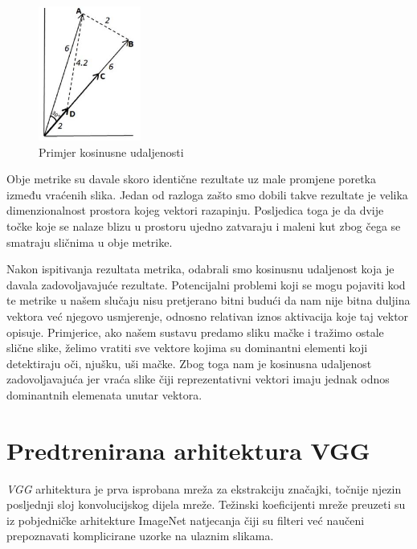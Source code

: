 \documentclass[times, utf8, proizvoljni, numeric]{fer}
\begin{document}
\begin{figure}[!ht]
	\begin{center}
		\captionsetup{justification=centering}
		\includegraphics[width=0.3\textwidth]{./imgs/kosinusna_udaljenost.png}
		\caption{Primjer kosinusne udaljenosti \cite{VectorSimilarity}}
		\label{fg:kosinusna_udaljenost}
	\end{center}
\end{figure}

Obje metrike su davale skoro identične rezultate uz male promjene poretka između vraćenih slika. Jedan od razloga zašto smo dobili takve rezultate je velika dimenzionalnost prostora kojeg vektori razapinju. Posljedica toga je da dvije točke koje se nalaze blizu u prostoru ujedno zatvaraju i maleni kut zbog čega se smatraju sličnima u obje metrike.	

Nakon ispitivanja rezultata metrika, odabrali smo kosinusnu udaljenost koja je davala zadovoljavajuće rezultate. Potencijalni problemi koji se mogu pojaviti kod te metrike u našem slučaju nisu pretjerano bitni budući da nam nije bitna duljina vektora već njegovo usmjerenje, odnosno relativan iznos aktivacija koje taj vektor opisuje. Primjerice, ako našem sustavu predamo sliku mačke i tražimo ostale slične slike, želimo vratiti sve vektore kojima su dominantni elementi koji detektiraju oči, njušku, uši mačke. Zbog toga nam je kosinusna udaljenost zadovoljavajuća jer vraća slike čiji reprezentativni vektori imaju jednak odnos dominantnih elemenata unutar vektora.


\section{Predtrenirana arhitektura VGG}

\textit{VGG} arhitektura je prva isprobana mreža za ekstrakciju značajki, točnije njezin posljednji sloj konvolucijskog dijela mreže. Težinski koeficijenti mreže preuzeti su iz pobjedničke arhitekture ImageNet natjecanja čiji su filteri već naučeni prepoznavati komplicirane uzorke na ulaznim slikama.
\end{document}
